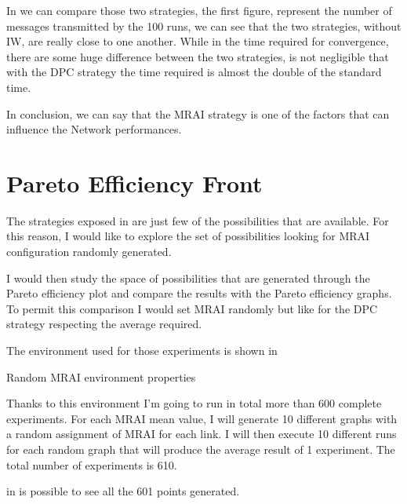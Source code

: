 In  we can compare those two strategies,
the first figure,  represent 
the number of messages transmitted by the \num{100} runs, we can see that
the two strategies, without \ac{IW}, are really close to one another.
While in the time required for convergence, 
there are some huge difference between the two strategies, is not negligible 
that with the \ac{DPC} strategy the time required is almost the double of the
standard time.

In conclusion, we can say that the \ac{MRAI} strategy is one of the factors that 
can influence the Network performances. 


\section{Pareto Efficiency Front}
\label{sec:bgp_mrai_pareto_front}

The strategies exposed in  are just few
of the possibilities that are available.
For this reason, I would like to explore the set of possibilities looking 
for \ac{MRAI} configuration randomly generated.

I would then study the space of possibilities that are generated through the 
Pareto efficiency plot and compare the results with the Pareto efficiency
graphs.
To permit this comparison I would set \ac{MRAI} randomly but like for
the \ac{DPC} strategy respecting the average required.

The environment used for those experiments is shown in 

\begin{table}[h]
	
	\caption{Random \ac{MRAI} environment properties}
	\label{tbl:random_env}
\end{table}

Thanks to this environment I'm going to run in total more than \num{600} complete
experiments.
For each \ac{MRAI} mean value, I will generate \num{10} different graphs with a random
assignment of \ac{MRAI} for each link.
I will then execute \num{10} different runs for each random graph that will produce
the average result of \num{1} experiment.
The total number of experiments is \num{610}.

in  is possible to see all the \num{601} points
generated.

